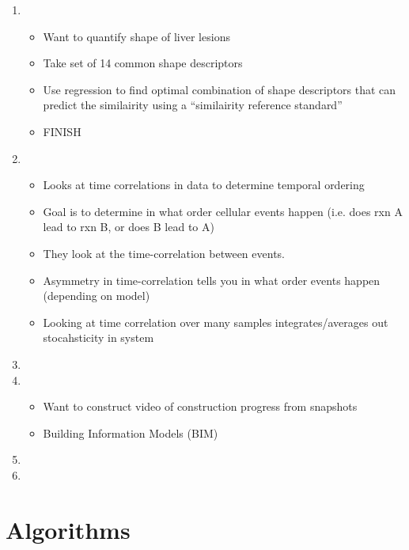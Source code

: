 \documentclass[12pt]{article}
\begin{document}
\begin{enumerate}
\item {}
\begin{itemize}
	\item Want to quantify shape of liver lesions
	\item Take set of 14 common shape descriptors
	\item Use regression to find optimal combination of shape descriptors that can predict the similairity using a ``similairity reference standard''
	\item FINISH
\end{itemize}
\item {}
\begin{itemize}
	\item Looks at time correlations in data to determine temporal ordering
	\item Goal is to determine in what order cellular events happen (i.e. does rxn A lead to rxn B, or does B lead to A)
	\item They look at the time-correlation between events.
	\item Asymmetry in time-correlation tells you in what order events happen (depending on model)
	\item Looking at time correlation over many samples integrates/averages out stocahsticity in system
\end{itemize}

\item {}

\item {}
\begin{itemize}
	\item Want to construct video of construction progress from snapshots
	\item Building Information Models (BIM) 
\end{itemize}

\item {}

\item {}


\end{enumerate}


\section{Algorithms}
\end{document}
